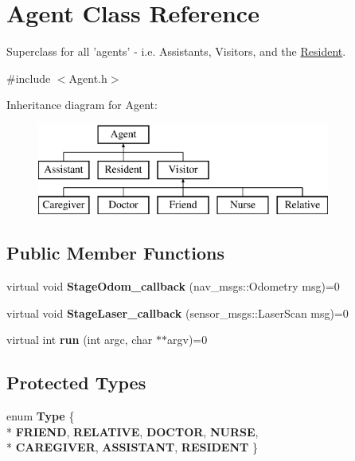 \hypertarget{classAgent}{\section{Agent Class Reference}
\label{classAgent}
}


Superclass for all 'agents' -\/ i.\-e. Assistants, Visitors, and the \hyperlink{classResident}{Resident}.  




{\ttfamily \#include $<$Agent.\-h$>$}

Inheritance diagram for Agent\-:\begin{figure}[H]
\begin{center}
\leavevmode
\includegraphics[height=3.000000cm]{classAgent}
\end{center}
\end{figure}
\subsection*{Public Member Functions}
\begin{DoxyCompactItemize}
\item 
\hypertarget{classAgent_a4b1182b9ee5dccaa871d71beef94a7d2}{virtual void {\bfseries Stage\-Odom\-\_\-callback} (nav\-\_\-msgs\-::\-Odometry msg)=0}\label{classAgent_a4b1182b9ee5dccaa871d71beef94a7d2}

\item 
\hypertarget{classAgent_adfe1de8bbeaa7e4a5f7f2ff3e45593e8}{virtual void {\bfseries Stage\-Laser\-\_\-callback} (sensor\-\_\-msgs\-::\-Laser\-Scan msg)=0}\label{classAgent_adfe1de8bbeaa7e4a5f7f2ff3e45593e8}

\item 
\hypertarget{classAgent_a70ae922d9ff12642634489b91ee5dbdf}{virtual int {\bfseries run} (int argc, char $\ast$$\ast$argv)=0}\label{classAgent_a70ae922d9ff12642634489b91ee5dbdf}

\end{DoxyCompactItemize}
\subsection*{Protected Types}
\begin{DoxyCompactItemize}
\item 
enum {\bfseries Type} \{ \\*
{\bfseries F\-R\-I\-E\-N\-D}, 
{\bfseries R\-E\-L\-A\-T\-I\-V\-E}, 
{\bfseries D\-O\-C\-T\-O\-R}, 
{\bfseries N\-U\-R\-S\-E}, 
\\*
{\bfseries C\-A\-R\-E\-G\-I\-V\-E\-R}, 
{\bfseries A\-S\-S\-I\-S\-T\-A\-N\-T}, 
{\bfseries R\-E\-S\-I\-D\-E\-N\-T}
 \}
\end{DoxyCompactItemize}
